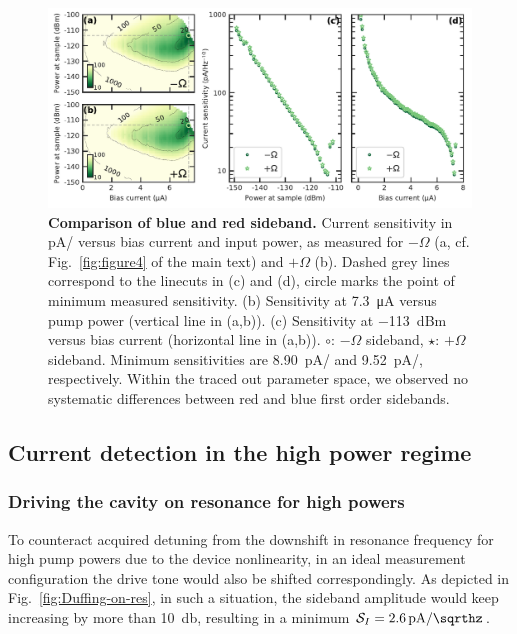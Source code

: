 \begin{figure}
	\centering
	\includegraphics[width=\linewidth]{chapter-currentdetection/figures/SM_plusminus}
	\caption{
		\textbf{Comparison of blue and red sideband.}
		Current sensitivity in \si{\pico\ampere/\sqrthz} versus bias current and input power, as measured for $-\Omega$ (a, cf. Fig.~\ref{fig:figure4} of the main text) and $+\Omega$ (b).
		Dashed grey lines correspond to the linecuts in (c) and (d), circle marks the point of minimum measured sensitivity.
		(b) Sensitivity at \SI{7.3}{\micro\ampere} versus pump power (vertical line in (a,b)).
		(c) Sensitivity at \SI{-113}{dBm} versus bias current (horizontal line in (a,b)).
		$\circ$: $-\Omega$ sideband, $\star$: $+\Omega$ sideband.
		Minimum sensitivities are \SI{8.90}{\pico\ampere/\sqrthz} and \SI{9.52}{\pico\ampere/\sqrthz}, respectively.
		Within the traced out parameter space, we observed no systematic differences between red and blue first order sidebands.
	}
	\label{fig:plusminus}
\end{figure}


\subsection{Current detection in the high power regime}\label{sec:high_powers}

\subsubsection{Driving the cavity on resonance for high powers}\label{sec:drive_shift}
To counteract acquired detuning from the downshift in resonance frequency for high pump powers due to the device nonlinearity, in an ideal measurement configuration the drive tone would also be shifted correspondingly.
% 
As depicted in Fig.~\ref{fig:Duffing-on-res}, in such a situation, the sideband amplitude would keep increasing by more than \SI{10}{\decibel}, resulting in a minimum $\mathcal{S}_I=\SI{2.6}{\pico\ampere/\sqrthz}$.


